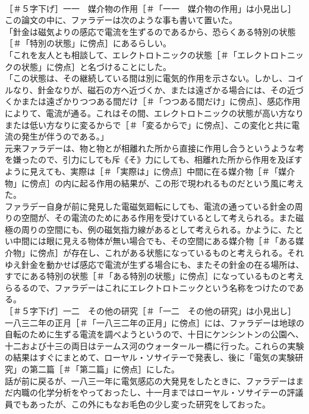 \documentclass[8pt]{extreport}
\begin{document}
\begin{CJK}{UTF8}{min}
\\	［＃５字下げ］一一　媒介物の作用［＃「一一　媒介物の作用」は小見出し］
\\	この論文の中に、ファラデーは次のような事も書いて置いた。
\\	「針金は磁気よりの感応で電流を生ずるのであるから、恐らくある特別の状態［＃「特別の状態」に傍点］にあるらしい。
\\	「これを友人とも相談して、エレクトロトニックの状態［＃「エレクトロトニックの状態」に傍点］と名づけることにした。
\\	「この状態は、その継続している間は別に電気的作用を示さない。しかし、コイルなり、針金なりが、磁石の方へ近づくか、または遠ざかる場合には、その近づくかまたは遠ざかりつつある間だけ［＃「つつある間だけ」に傍点］、感応作用によりて、電流が通る。これはその間、エレクトロトニックの状態が高い方なりまたは低い方なりに変るからで［＃「変るからで」に傍点］、この変化と共に電流の発生が伴うのである。」
\\	元来ファラデーは、物と物とが相離れた所から直接に作用し合うというような考を嫌ったので、引力にしても斥《そ》力にしても、相離れた所から作用を及ぼすように見えても、実際は［＃「実際は」に傍点］中間に在る媒介物［＃「媒介物」に傍点］の内に起る作用の結果が、この形で現われるものだという風に考えた。
\\	ファラデー自身が前に発見した電磁気廻転にしても、電流の通っている針金の周りの空間が、その電流のためにある作用を受けているとして考えられる。また磁極の周りの空間にも、例の磁気指力線があるとして考えられる。かように、たとい中間には眼に見える物体が無い場合でも、その空間にある媒介物［＃「ある媒介物」に傍点］が存在し、これがある状態になっているものと考えられる。それゆえ針金を動かせば感応で電流が生ずる場合にも、またその針金の在る場所は、すでにある特別の状態［＃「ある特別の状態」に傍点］になっているものと考えらるるので、ファラデーはこれにエレクトロトニックという名称をつけたのである。
\\	［＃５字下げ］一二　その他の研究［＃「一二　その他の研究」は小見出し］
\\	一八三二年の正月［＃「一八三二年の正月」に傍点］には、ファラデーは地球の自転のために生ずる電流を調べようというので、十日にケンシントンの公園へ、十二および十三の両日はテームス河のウォータールー橋に行った。これらの実験の結果はすぐにまとめて、ローヤル・ソサイテーで発表し、後に「電気の実験研究」の第二篇［＃「第二篇」に傍点］にした。
\\	話が前に戻るが、一八三一年に電気感応の大発見をしたときに、ファラデーはまだ内職の化学分析をやっておったし、十一月まではローヤル・ソサイテーの評議員でもあったが、この外にもなお毛色の少し変った研究をしておった。

\end{CJK}
\end{document}
